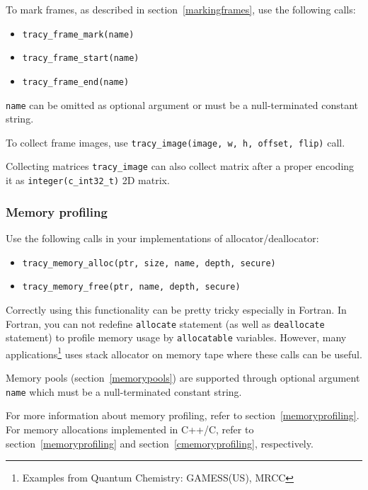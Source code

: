 \documentclass[hidelinks,titlepage,a4paper,twoside]{article}
\begin{document}
To mark frames, as described in section~\ref{markingframes}, use the following calls:

\begin{itemize}
\item \texttt{tracy\_frame\_mark(name)}
\item \texttt{tracy\_frame\_start(name)}
\item \texttt{tracy\_frame\_end(name)}
\end{itemize}

\texttt{name} can be omitted as optional argument or must be a null-terminated constant string.

To collect frame images, use \texttt{tracy\_image(image, w, h, offset, flip)} call.

\begin{bclogo}[
noborder=true,
couleur=black!5,
logo=\bclampe
]{Collecting matrices}
\texttt{tracy\_image} can also collect matrix after a proper encoding it as \texttt{integer(c\_int32\_t)} 2D matrix.
\end{bclogo}

\subsubsection{Memory profiling}

Use the following calls in your implementations of allocator/deallocator:

\begin{itemize}
\item \texttt{tracy\_memory\_alloc(ptr, size, name, depth, secure)}
\item \texttt{tracy\_memory\_free(ptr, name, depth, secure)}
\end{itemize}

Correctly using this functionality can be pretty tricky especially in Fortran.
In Fortran, you can not redefine \texttt{allocate} statement (as well as \texttt{deallocate} statement) to profile memory usage by \texttt{allocatable} variables.
However, many applications\footnote{Examples from Quantum Chemistry: GAMESS(US), MRCC} uses stack allocator on memory tape where these calls can be useful.

Memory pools (section~\ref{memorypools}) are supported through optional argument \texttt{name} which must be a null-terminated constant string.

For more information about memory profiling, refer to section~\ref{memoryprofiling}.
For memory allocations implemented in C++/C,  refer to section~\ref{memoryprofiling} and section~\ref{cmemoryprofiling}, respectively.
\end{document}
